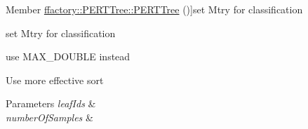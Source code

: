 \begin{DoxyRefList}
Member \hyperlink{classffactory_1_1_p_e_r_t_tree_a0795e03e41e6d8cfb06045840bf0cfdd}{ffactory\-:\-:P\-E\-R\-T\-Tree\-:\-:P\-E\-R\-T\-Tree} ()]set Mtry for classification  
\item[\label{todo__todo000014}%
\hypertarget{todo__todo000014}{}%
Member \hyperlink{classffactory_1_1_randomized_tree_a17a9eee17b97e9ce60aee2599586402e}{ffactory\-:\-:Randomized\-Tree\-:\-:Randomized\-Tree} ()]set Mtry for classification  
\item[\label{todo__todo000008}%
\hypertarget{todo__todo000008}{}%
Member \hyperlink{classffactory_1_1_split_statistics_container_a83fd03162751dd8b7a39629c56594a1d}{ffactory\-:\-:Split\-Statistics\-Container\-:\-:Split\-Statistics\-Container} ()]use M\-A\-X\-\_\-\-D\-O\-U\-B\-L\-E instead  
\item[\label{todo__todo000009}%
\hypertarget{todo__todo000009}{}%
Member \hyperlink{classffactory_1_1_stream_prox_cache_a39cf61205bb1c626c5b8fc0be3ec2c13}{ffactory\-:\-:Stream\-Prox\-Cache\-:\-:compute\-Nearest\-Samples} (Data\-Vector $\ast$leaf\-Ids, Index\-Type number\-Of\-Samples)]Use more effective sort 
\begin{DoxyParams}{Parameters}
{\em leaf\-Ids} & \\
\hline
{\em number\-Of\-Samples} & \\
\hline
\end{DoxyParams}

\end{DoxyRefList}